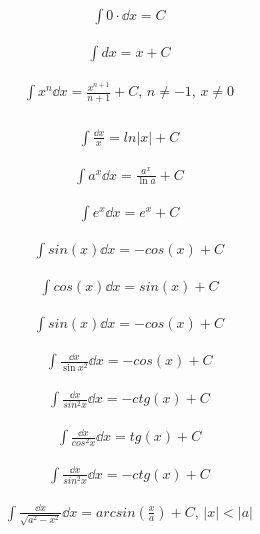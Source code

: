 \begin{align*}
    \int 0 \cdot \dd x = C
\end{align*}

\begin{align*}
    \int dx = x + C
\end{align*}

\begin{align*}
    \int x^n \dd x = \frac{x^{n+1}}{n+1} + C, \, n \neq -1, \, x \neq 0 \\
\end{align*}

\begin{align*}
    \int \frac{\dd x}{x} = ln|x| + C
\end{align*}

\begin{align*}
    \int a^x \dd x = \frac{a^x}{\ln a} + C
\end{align*}

\begin{align*}
    \int e^x \dd x = e^x + C
\end{align*}

\begin{align*}
    \int sin(x) \dd x = -cos(x) + C
\end{align*}

\begin{align*}
    \int cos(x) \dd x = sin(x) + C
\end{align*}

\begin{align*}
    \int sin(x) \dd x = -cos(x) + C
\end{align*}

\begin{align*}
    \int \frac{\dd x}{\sin{x}^2} \dd x = -cos(x) + C
\end{align*}

\begin{align*}
    \int \frac{\dd x}{sin^2x} \dd x = -ctg(x) + C
\end{align*}

\begin{align*}
    \int \frac{\dd x}{cos^2x} \dd x = tg(x) + C
\end{align*}

\begin{align*}
    \int \frac{\dd x}{sin^2x} \dd x = -ctg(x) + C
\end{align*}

\begin{align*}
    \int \frac{\dd x}{\sqrt{a^2-x^2}} \dd x = arcsin\left(\frac{x}{a}\right) + C, \, |x| < |a|
\end{align*}


